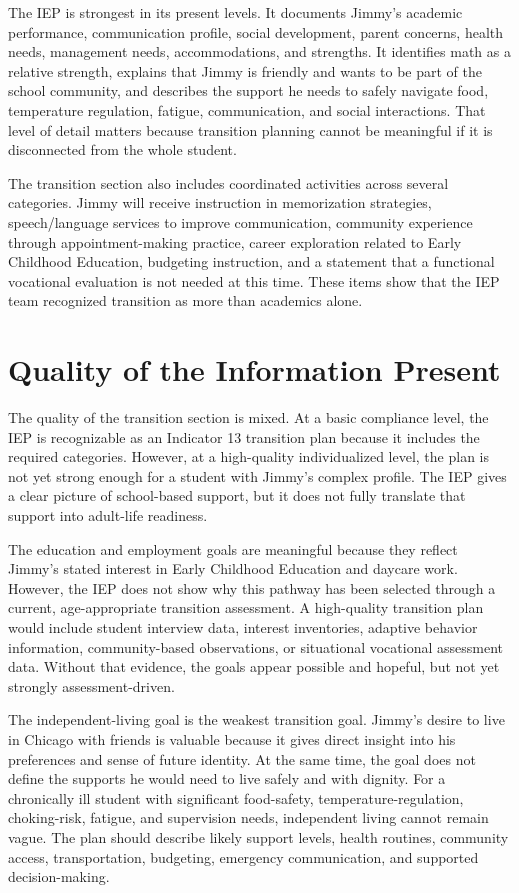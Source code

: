 The IEP is strongest in its present levels. It documents Jimmy's academic performance, communication profile, social development, parent concerns, health needs, management needs, accommodations, and strengths. It identifies math as a relative strength, explains that Jimmy is friendly and wants to be part of the school community, and describes the support he needs to safely navigate food, temperature regulation, fatigue, communication, and social interactions. That level of detail matters because transition planning cannot be meaningful if it is disconnected from the whole student.

The transition section also includes coordinated activities across several categories. Jimmy will receive instruction in memorization strategies, speech/language services to improve communication, community experience through appointment-making practice, career exploration related to Early Childhood Education, budgeting instruction, and a statement that a functional vocational evaluation is not needed at this time. These items show that the IEP team recognized transition as more than academics alone.

\section*{Quality of the Information Present}

The quality of the transition section is mixed. At a basic compliance level, the IEP is recognizable as an Indicator 13 transition plan because it includes the required categories. However, at a high-quality individualized level, the plan is not yet strong enough for a student with Jimmy's complex profile. The IEP gives a clear picture of school-based support, but it does not fully translate that support into adult-life readiness.

The education and employment goals are meaningful because they reflect Jimmy's stated interest in Early Childhood Education and daycare work. However, the IEP does not show why this pathway has been selected through a current, age-appropriate transition assessment. A high-quality transition plan would include student interview data, interest inventories, adaptive behavior information, community-based observations, or situational vocational assessment data. Without that evidence, the goals appear possible and hopeful, but not yet strongly assessment-driven.

The independent-living goal is the weakest transition goal. Jimmy's desire to live in Chicago with friends is valuable because it gives direct insight into his preferences and sense of future identity. At the same time, the goal does not define the supports he would need to live safely and with dignity. For a chronically ill student with significant food-safety, temperature-regulation, choking-risk, fatigue, and supervision needs, independent living cannot remain vague. The plan should describe likely support levels, health routines, community access, transportation, budgeting, emergency communication, and supported decision-making.

